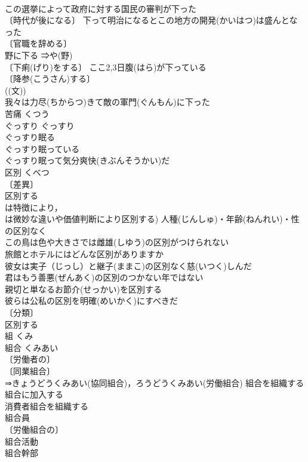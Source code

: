 \documentclass[8pt]{extreport}
\begin{document}
\begin{CJK}{UTF8}{min}
\\	この選挙によって政府に対する国民の審判が下った 
\\	〔時代が後になる〕 下って明治になるとこの地方の開発(かいはつ)は盛んとなった 
\\	〔官職を辞める〕
\\	野に下る ⇒や(野) 
\\	〔下痢(げり)をする〕 ここ2,3日腹(はら)が下っている 
\\	〔降参(こうさん)する〕
\\	((文)) 
\\	我々は力尽(ちからつ)きて敵の軍門(ぐんもん)に下った 
\\	苦痛	くつう	
\\	ぐっすり	ぐっすり	
\\	ぐっすり眠る 
\\	ぐっすり眠っている 
\\	ぐっすり眠って気分爽快(きぶんそうかい)だ 
\\	区別	くべつ	
\\	〔差異〕
\\	区別する 
\\	は特徴により，
\\	は微妙な違いや価値判断により区別する) 人種(じんしゅ)・年齢(ねんれい)・性の区別なく 
\\	この鳥は色や大きさでは雌雄(しゆう)の区別がつけられない 
\\	旅館とホテルにはどんな区別がありますか 
\\	彼女は実子（じっし）と継子(ままこ)の区別なく慈(いつく)しんだ 
\\	君はもう善悪(ぜんあく)の区別のつかない年ではない 
\\	親切と単なるお節介(せっかい)を区別する 
\\	彼らは公私の区別を明確(めいかく)にすべきだ 
\\	〔分類〕
\\	区別する 
\\	組	くみ	
\\	組合	くみあい	
\\	〔労働者の〕
\\	〔同業組合〕
\\	⇒きょうどうくみあい(協同組合)，ろうどうくみあい(労働組合) 組合を組織する 
\\	組合に加入する 
\\	消費者組合を組織する 
\\	組合員 
\\	〔労働組合の〕
\\	組合活動 
\\	組合幹部 

\end{CJK}
\end{document}

